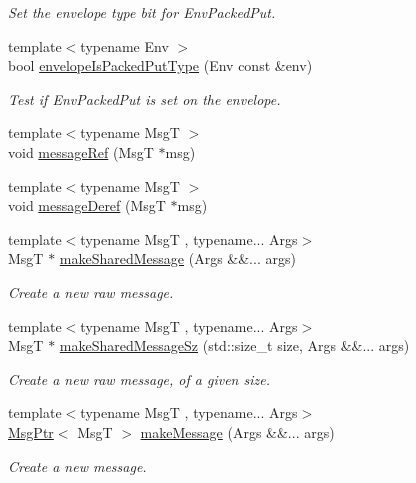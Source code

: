 \begin{DoxyCompactItemize}
\begin{DoxyCompactList}\small\item\em Set the envelope type bit for {\ttfamily Env\+Packed\+Put}. \end{DoxyCompactList}\item 
{\footnotesize template$<$typename Env $>$ }\\bool \hyperlink{namespacevt_aba8a23bc60c8177816d94e913aed6107}{envelope\+Is\+Packed\+Put\+Type} (Env const \&env)
\begin{DoxyCompactList}\small\item\em Test if {\ttfamily Env\+Packed\+Put} is set on the envelope. \end{DoxyCompactList}\item 
{\footnotesize template$<$typename MsgT $>$ }\\void \hyperlink{namespacevt_aa4a692a62fffd91e7e708d8047897a60}{message\+Ref} (MsgT $\ast$msg)
\item 
{\footnotesize template$<$typename MsgT $>$ }\\void \hyperlink{namespacevt_a85f2aa61b92eeeedc61654cd4865b2a9}{message\+Deref} (MsgT $\ast$msg)
\item 
{\footnotesize template$<$typename MsgT , typename... Args$>$ }\\MsgT $\ast$ \hyperlink{namespacevt_a6c87ed02a655497ee05109f3c50374fd}{make\+Shared\+Message} (Args \&\&... args)
\begin{DoxyCompactList}\small\item\em Create a new \textquotesingle{}raw\textquotesingle{} message. \end{DoxyCompactList}\item 
{\footnotesize template$<$typename MsgT , typename... Args$>$ }\\MsgT $\ast$ \hyperlink{namespacevt_a1cad9543b26045826f0fa5d17a2dfd2f}{make\+Shared\+Message\+Sz} (std\+::size\+\_\+t size, Args \&\&... args)
\begin{DoxyCompactList}\small\item\em Create a new \textquotesingle{}raw\textquotesingle{} message, of a given size. \end{DoxyCompactList}\item 
{\footnotesize template$<$typename MsgT , typename... Args$>$ }\\\hyperlink{namespacevt_a9f5ebd62ee9d6dd8829e3e1cc4f858e9}{Msg\+Ptr}$<$ MsgT $>$ \hyperlink{namespacevt_a948c0bbe39c34326b5453065a461ebaa}{make\+Message} (Args \&\&... args)
\begin{DoxyCompactList}\small\item\em Create a new message. \end{DoxyCompactList}\item 

\end{DoxyCompactItemize}
